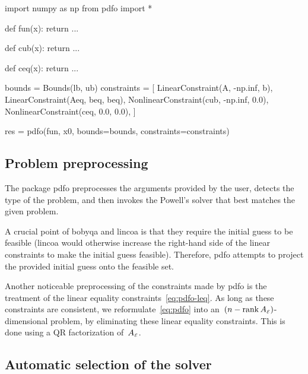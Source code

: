 \begin{lstpython}[%
    caption=An elementary example of using \gls{pdfo} in Python,
    label=lst:minimum-example-python,
]
    import numpy as np
    from pdfo import *

    def fun(x):
        return ...
    
    def cub(x):
        return ...
    
    def ceq(x):
        return ...
    
    bounds = Bounds(lb, ub)
    constraints = [
        LinearConstraint(A, -np.inf, b),
        LinearConstraint(Aeq, beq, beq),
        NonlinearConstraint(cub, -np.inf, 0.0),
        NonlinearConstraint(ceq, 0.0, 0.0),
    ]

    res = pdfo(fun, x0, bounds=bounds, constraints=constraints)
\end{lstpython}

\subsection{Problem preprocessing}
\label{subsec:pdfo-preprocessing}

The package \gls{pdfo} preprocesses the arguments provided by the user, detects the type of the problem, and then invokes the Powell's solver that best matches the given problem.

A crucial point of \gls{bobyqa} and \gls{lincoa} is that they require the initial guess to be feasible (\gls{lincoa} would otherwise increase the right-hand side of the linear constraints to make the initial guess feasible).
Therefore, \gls{pdfo} attempts to project the provided initial guess onto the feasible set.

Another noticeable preprocessing of the constraints made by \gls{pdfo} is the treatment of the linear equality constraints~\cref{eq:pdfo-leq}.
As long as these constraints are consistent, we reformulate~\cref{eq:pdfo} into an~$(n - \operatorname{rank} A_{\scriptscriptstyle\mathcal{E}})$-dimensional problem, by eliminating these linear equality constraints.
This is done using a QR factorization of~$A_{\scriptscriptstyle\mathcal{E}}$.


\subsection{Automatic selection of the solver}
\label{subsec:solver-selection}


